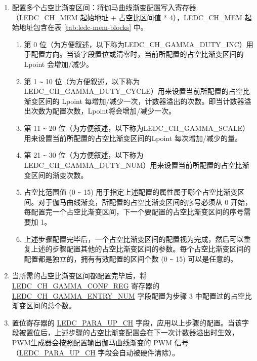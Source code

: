 \documentclass[main\_\_CN.tex]{subfiles}
\begin{document}
\begin{enumerate}
\begin{enumerate}
\begin{enumerate}
    \item 配置多个占空比渐变区间：将伽马曲线渐变配置写入寄存器（LEDC\_CH\_MEM 起始地址 + 占空比区间值 * 4），LEDC\_CH\_MEM  起始地址包含在表 \ref{tab:ledc-mem-blocks} 中。
    \begin{enumerate}
        \item 第 0 位（为方便叙述，以下称为LEDC\_CH\_GAMMA\_DUTY\_INC）用于配置方向。当该字段置位或清零时，当前所配置的占空比渐变区间的 Lpoint 会增加/减少。
        \item 第 1 \verb+~+ 10 位（为方便叙述，以下称为LEDC\_CH\_GAMMA\_DUTY\_CYCLE）用来设置当前所配置的占空比渐变区间的 Lpoint 每增加/减少一次，计数器溢出的次数。即当计数器溢出次数为配置次数，Lpoint将会增加/减少一次。
        \item 第 11 \verb+~+ 20 位（为方便叙述，以下称为LEDC\_CH\_GAMMA\_SCALE）用来设置当前所配置的占空比渐变区间的Lpoint 每次增加/减少的量。
        \item 第 21 \verb+~+ 30 位（为方便叙述，以下称为LEDC\_CH\_GAMMA\_DUTY\_NUM）用来设置当前所配置的占空比渐变区间的渐变次数。
        \item 占空比范围值 (0 \verb+~+ 15) 用于指定上述配置的属性属于哪个占空比渐变区间。对于伽马曲线渐变，所配置的占空比渐变区间的序号必须从 0 开始，每配置完一个占空比渐变区间，下一个要配置的占空比渐变区间的序号需要加 1。
        \item 上述步骤配置完毕后，一个占空比渐变区间的配置视为完成，然后可以重复上述的步骤配置其他的占空比渐变区间的参数。每个占空比渐变区间的配置都是独立的，拥有有效配置的区间个数 (0 \verb+~+ 15) 可以是任意的。
    \end{enumerate}
    \item 当所需的占空比渐变区间都配置完毕后，将 \hyperref[regdesc:LEDCCHNGAMMACONFREG]{LEDC\_CH\_GAMMA\_CONF\_REG} 寄存器的 \hyperref[fielddesc:LEDCCHNGAMMAENTRYNUM]{LEDC\_CH\_GAMMA\_ENTRY\_NUM} 字段配置为步骤 3 中配置过的占空比渐变区间的总个数。
    \item 置位寄存器的 \hyperref[fielddesc:LEDCPARAUPCHN]{LEDC\_PARA\_UP\_CH} 字段，应用以上步骤的配置。当该字段被置位后，上述步骤的占空比渐变配置会在下一次计数器溢出时生效，PWM生成器会按照配置输出伽马曲线渐变的 PWM 信号（\hyperref[fielddesc:LEDCPARAUPCHN]{LEDC\_PARA\_UP\_CH} 字段会自动被硬件清除）。
\end{enumerate}
\end{enumerate}
\end{enumerate}
\end{document}
